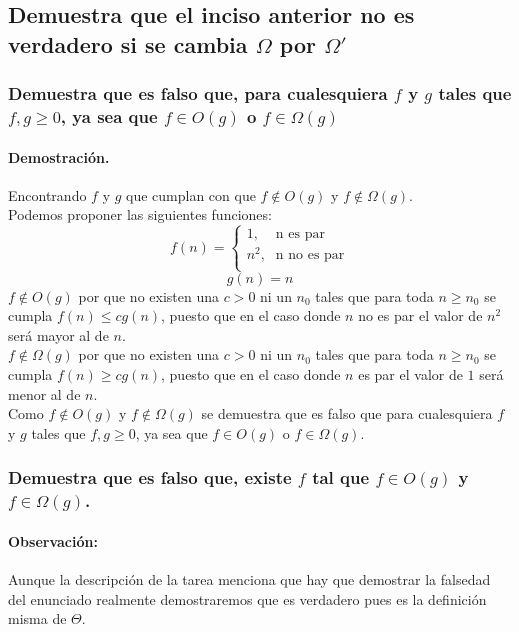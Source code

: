 \documentclass[12pt]{article}
\begin{document}
\subsection{Demuestra que el inciso anterior no es verdadero si se cambia $\Omega$ por $\Omega'$}
\subsubsection{Demuestra que es falso que, para cualesquiera $f$ y $g$ tales que $f,g\geq 0$, ya sea que $f\in O(g)$ o $f\in\Omega(g)$}
\paragraph{Demostración.} Encontrando $f$ y $g$ que cumplan con que $f\notin O(g)$ y $f\notin\Omega(g)$.\\
Podemos proponer las siguientes funciones:
\begin{equation}\label{f_ej3.2}
f(n) = 
\begin{cases}
\text{1,} &\text{n es par}\\
\text{$n^{2}$,} &\text{n no es par} \\
\end{cases}
\end{equation}
\begin{equation}\label{g_ej3.2}
g(n) = n
\end{equation}
$f\notin O(g)$ por que no existen una $c>0$  ni un $n_{0}$ tales que para toda $n\geq n_{0}$ se cumpla $f(n)\leq cg(n)$, puesto que en el caso donde $n$ no es par el valor de $n^{2}$ será mayor al de $n$.\\
$f\notin\Omega(g)$ por que no existen una $c>0$  ni un $n_{0}$ tales que para toda $n\geq n_{0}$ se cumpla $f(n)\geq cg(n)$, puesto que en el caso donde $n$ es par el valor de $1$ será menor al de $n$.\\
Como $f\notin O(g)$ y $f\notin\Omega(g)$ se demuestra que es falso que  para cualesquiera $f$ y $g$ tales que $f,g\geq 0$, ya sea que $f\in O(g)$ o $f\in\Omega(g)$.
\subsubsection{Demuestra que es falso que, existe $f$ tal que $f\in O(g)$ y $f\in\Omega(g)$.}
\paragraph{Observación:} Aunque la descripción de la tarea menciona que hay que demostrar la falsedad del enunciado realmente demostraremos que es verdadero pues es la definición misma de $\Theta$.
\end{document}
